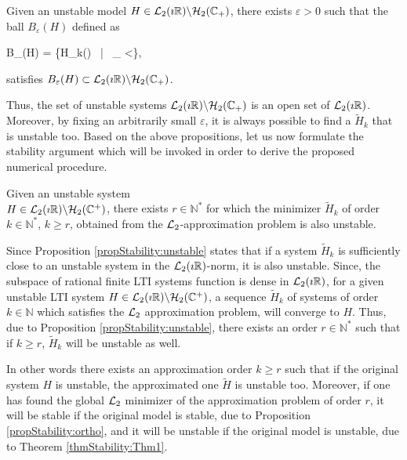 \documentclass[graybox]{svmult}
\begin{document}
\begin{proposition} \label{propStability:unstable}
	Given an unstable model $H\in {\mathcal{L}_{2}}(\imath\mathbb{R})\backslash {\mathcal{H}_{2}}(\mathbb{C}_+)$, there exists $\varepsilon>0$ such that the ball $B_{\varepsilon}(H)$ defined as 
	\begin{eq}
		B_{\varepsilon}(H)  = \Big\{\tilde H_k\in \Ltwo(\imath\Real)~ \big|~ _{\Ltwo} <\varepsilon \Big\},
	\end{eq}
	satisfies $B_{\varepsilon}(H)\subset {\mathcal{L}_{2}}(\imath\mathbb{R})\backslash {\mathcal{H}_{2}}(\mathbb{C}_+)$.
\end{proposition}
Thus, the set of unstable systems ${\mathcal{L}_{2}}(\imath\mathbb{R})\backslash {\mathcal{H}_{2}}(\mathbb{C}_+)$ is an open set of ${\mathcal{L}_{2}}(\imath\mathbb{R})$. Moreover, by fixing an arbitrarily small $\varepsilon$, it is always possible to find a $\tilde H_k$ that is unstable too. Based on the above propositions, let us now formulate the stability argument which will be invoked in order to derive the proposed numerical procedure.

\begin{theorem} \label{thmStability:Thm1}
	Given an unstable system \\ $H\in {\mathcal{L}_{2}}(\imath\mathbb{R})\backslash {\mathcal{H}_{2}}(\mathbb{C}^+)$,  there exists  $r\in \mathbb{N}^*$ for which  the minimizer $\tilde H_k$ of order $k\in \mathbb{N}^*$, $k\geq r$, obtained from  the ${\mathcal{L}_{2}}$-approximation problem is also unstable.
\end{theorem} 
Since Proposition \ref{propStability:unstable} states that if a system $\tilde H_k$ is sufficiently close to an unstable system in the ${\mathcal{L}_{2}}(\imath\mathbb{R})$-norm, it is also unstable. Since, the subspace of rational finite LTI systems function is dense in  ${\mathcal{L}_{2}}(\imath\mathbb{R})$, for a given unstable LTI system $H\in {\mathcal{L}_{2}}(\imath\mathbb{R})\backslash {\mathcal{H}_{2}}(\mathbb{C}^+)$,  a sequence $\tilde H_k$ of systems of order $k\in \mathbb N$ which satisfies the ${\mathcal{L}_{2}}$ approximation problem, will converge to $H$. Thus, due to Proposition \ref{propStability:unstable}, there exists an order $r\in\mathbb{N}^*$ such that if $k\geq r$, $\tilde H_k$ will be unstable as well.

In other words there exists an approximation order $k\geq r$ such that if the original system $H$ is unstable, the approximated one $\tilde H$ is unstable too. Moreover, if one has found the global ${\mathcal{L}_{2}}$ minimizer of the approximation problem of order $r$, it will be stable if the original model is stable, due to Proposition \ref{propStability:ortho}, and it will be unstable if the original model is unstable, due to Theorem \ref{thmStability:Thm1}. 
\end{document}
